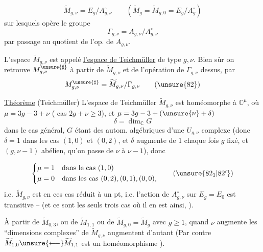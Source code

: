 \[
 \widetilde M_{g,\nu}=E_g/A_{g,\nu}^{\circ}
 \qquad
 (\widetilde M_g=\widetilde M_{g,0}=E_g/A_g^{\circ})
 \tag{81}
\]
sur lesquels opère le groupe 
\[
 \Gamma_{g,\nu}=A_{g,\nu}/A_{g,\nu}^{\circ}
\]
par passage au quotient de l'op. de \(A_{g,\nu}\).

 L'espace \(\widetilde M_{g,\nu}\)  est appelé \uline{l'espace de Teichmüller} de type \(g,\nu\). Bien sûr on retrouve \(M_{g,\nu}^{\unsure{\sharp}}\) à partir de \(\widetilde M_{g,\nu}\) et de l'opération de \(\Gamma_{g,\nu}\) dessus, par
\[
 M_{g,\nu}^{\unsure{\sharp}}=\widetilde M_{g,\nu}/\Gamma_{g,\nu}
 \tag{\unsure{82}}
\]

\uline{Théorème} (Teichmüller) L'espace de Teichmüller \(\widetilde M_{g,\nu}\) est homéomorphe à  \(\mathbb C^\mu\), où \(\mu=3g-3+\nu\) ( cas  \(2g+\nu\geq 3\)), et \(\mu=3g-3+(\unsure{\nu}+\delta)\)
\[
 \delta=\dim_{\mathbb C}G
\]
dans le cas général, \(G\) étant  des autom. algébriques d'une \(U_{g,\nu}\) complexe (donc \(\delta=1\) dans les cas   \((1,0)\) et \((0,2)\), et \(\delta\) augmente de 1 chaque fois  \(g\) fixé, et \((g,\nu-1)\) abélien, qu'on passe de \(\nu\) à \(\nu-1\)), donc



\[
 \left\{
 \begin{aligned}
 \mu&=1\quad\text{dans le cas }(1,0)\\
 \mu&=0\quad\text{dans les cas }(0,2),(0,1),(0,0),
 \end{aligned}
 \right.
 \tag{\unsure{\(82_1\)|\(82'\)}}
\]
i.e. \(\widetilde M_{g,\nu}\) est en ces cas réduit à un pt, i.e. l'action de \(A_{g,\nu}^{\circ}\) sur \(E_g=E_0\) est  transitive -- (et ce sont  les seuls trois cas où il en est ainsi, ).


À partir de \(\widetilde M_{0,3}\), ou de \(\widetilde M_{1,1}\) ou de \(\widetilde M_{g,0}=\widetilde M_g\) avec \(g\geq 1\), quand \(\nu\) augmente les ``dimensions complexes'' de \(\widetilde M_{g,\nu}\) augmentent d'autant (Par contre \(\widetilde M_{1,0}\unsure{\longleftarrow}\widetilde M_{1,1}\) est un homéomorphisme ).

